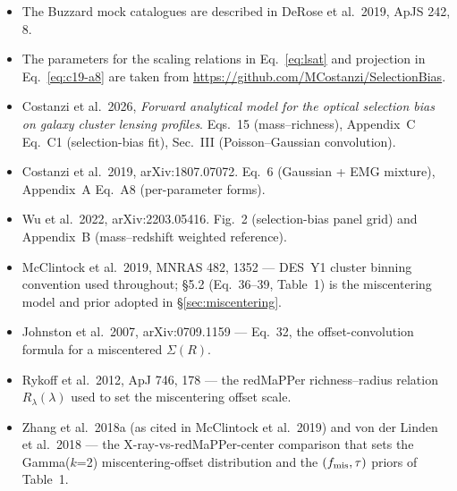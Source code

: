 \documentclass[a4paper, 11pt]{article}
\begin{document}
\begin{itemize}
  \setlength\itemsep{1pt}
  \item The Buzzard mock catalogues are described in DeRose et al.\ 2019, ApJS 242, 8.
  \item The parameters for the scaling relations in Eq.~\ref{eq:lsat} and projection in Eq.~\ref{eq:c19-a8} are taken from \href{https://github.com/MCostanzi/SelectionBias}{https://github.com/MCostanzi/SelectionBias}.
  \item Costanzi et al.\ 2026, \emph{Forward analytical model for the
    optical selection bias on galaxy cluster lensing profiles}.
    Eqs.~15 (mass--richness), Appendix~C Eq.~C1 (selection-bias fit),
    Sec.~III (Poisson--Gaussian convolution).
  \item Costanzi et al.\ 2019, arXiv:1807.07072. Eq.~6 (Gaussian + EMG
    mixture), Appendix~A Eq.~A8 (per-parameter forms).
  \item Wu et al.\ 2022, arXiv:2203.05416. Fig.~2 (selection-bias panel
    grid) and Appendix~B (mass--redshift weighted reference).
  \item McClintock et al.\ 2019, MNRAS 482, 1352 --- DES~Y1 cluster
    binning convention used throughout; \S5.2 (Eq.~36--39, Table~1) is
    the miscentering model and prior adopted in \S\ref{sec:miscentering}.
  \item Johnston et al.\ 2007, arXiv:0709.1159 --- Eq.~32, the
    offset-convolution formula for a miscentered $\Sigma(R)$.
  \item Rykoff et al.\ 2012, ApJ 746, 178 --- the redMaPPer
    richness--radius relation $R_\lambda(\lambda)$ used to set the
    miscentering offset scale.
  \item Zhang et al.\ 2018a (as cited in McClintock et al.\ 2019) and
    von der Linden et al.\ 2018 --- the X-ray-vs-redMaPPer-center
    comparison that sets the Gamma($k$=2) miscentering-offset
    distribution and the $(f_{\rm mis}, \tau)$ priors of Table~1.
\end{itemize}
\end{document}
